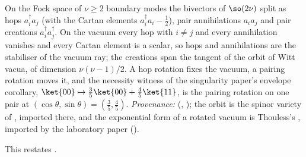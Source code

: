 On the Fock space of $\nu \geq 2$ boundary modes the bivectors of $\so(2\nu)$ split as hops $a_i^{\dagger}a_j$ (with the Cartan elements $a_i^{\dagger}a_i - \tfrac12$), pair annihilations $a_ia_j$ and pair creations $a_i^{\dagger}a_j^{\dagger}$. On the vacuum every hop with $i \neq j$ and every annihilation vanishes and every Cartan element is a scalar, so hops and annihilations are the stabiliser of the vacuum ray; the creations span the tangent of the orbit of Witt vacua, of dimension $\nu(\nu-1)/2$. A hop rotation fixes the vacuum, a pairing rotation moves it, and the necessity witness of the singularity paper's envelope corollary, $\ket{00} \mapsto \tfrac35\ket{00} + \tfrac45\ket{11}$, is the pairing rotation on one pair at $(\cos\theta, \sin\theta) = (\tfrac35, \tfrac45)$. \emph{Provenance:} \cite[Prop.~13.4, Cor.~11.6]{ButlerT5} (, ); the orbit is the spinor variety of \cite{Cartan1938, Chevalley1954}, imported there, and the exponential form of a rotated vacuum is Thouless's \cite{Thouless1960}, imported by the laboratory paper \cite[Fact~2.10]{ButlerT16} ().

This restates .
